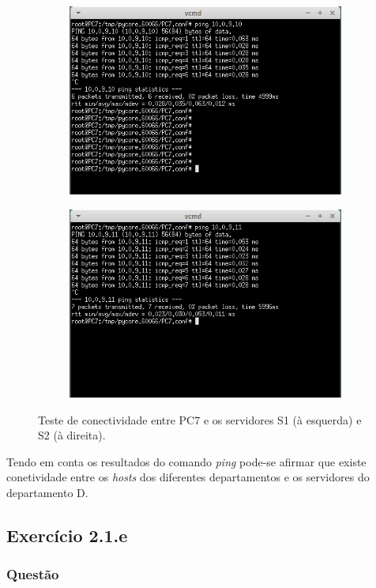 \documentclass{llncs}
\begin{document}
\begin{figure}[h]
	\centering
	\begin{subfigure}{.5\textwidth}
		\centering
		\includegraphics[width=0.75\linewidth]{./imagens/PC7_S1.png}
	\end{subfigure}%
	\begin{subfigure}{.5\textwidth}
		\centering
		\includegraphics[width=0.75\linewidth]{./imagens/PC7_S2.png}
	\end{subfigure}
	\caption{Teste de conectividade entre PC7 e os servidores S1 (à esquerda) e S2 (à direita).}
	\label{fig:pc7_s}
\end{figure}

Tendo em conta os resultados do comando \textit{ping} pode-se afirmar que existe conetividade entre os \textit{hosts} dos diferentes departamentos e os servidores do departamento D.

\subsection{Exercício 2.1.e}
\subsubsection{Questão}\rule[-10pt]{0pt}{10pt}\\
\end{document}
